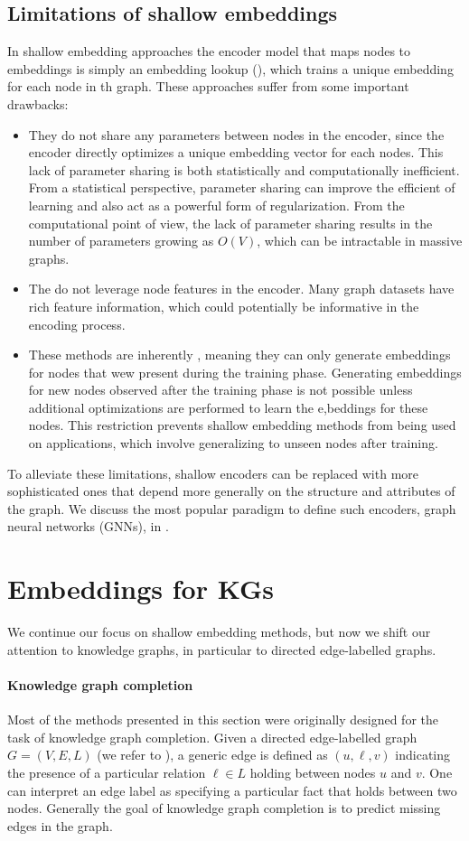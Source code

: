 \subsection{Limitations of shallow embeddings}
In shallow embedding approaches the encoder model that maps nodes to embeddings is simply an embedding lookup (), which trains a unique embedding for each node in th graph. These approaches suffer from some important drawbacks:
\begin{itemize}
    \item They do not share any parameters between nodes in the encoder, since the encoder directly optimizes a unique embedding vector for each nodes. This lack of parameter sharing is both statistically and computationally inefficient. From a statistical perspective, parameter sharing can improve the efficient of learning and also act as a powerful form of regularization. From the computational point of view, the lack of parameter sharing results in the number of parameters growing as $O(V)$, which can be intractable in massive graphs.
    \item The do not leverage node features in the encoder. Many graph datasets have rich feature information, which could potentially be informative in the encoding process.
    \item These methods are inherently , meaning they can only generate embeddings for nodes that wew present during the training phase. Generating embeddings for new nodes observed after the training phase is not possible unless additional optimizations are performed to learn the e,beddings for these nodes. This restriction prevents shallow embedding methods from being used on  applications, which involve generalizing to unseen nodes after training.
\end{itemize}
To alleviate these limitations, shallow encoders can be replaced with more sophisticated ones that depend more generally on the structure and attributes of the graph. We discuss the most popular paradigm to define such encoders, graph neural networks (GNNs), in .

\section{Embeddings for KGs}
We continue our focus on shallow embedding methods, but now we shift our attention to knowledge graphs, in particular to directed edge-labelled graphs.

\paragraph{Knowledge graph completion}
Most of the methods presented in this section were originally designed for the task of knowledge graph completion. Given a directed edge-labelled graph $G=(V, E, L)$ (we refer to ), a generic edge is defined as $(u,\ell,v)$ indicating the presence of a particular relation $\ell \in L$ holding between nodes $u$ and $v$. One can interpret an edge label as specifying a particular fact that holds between two nodes. Generally the goal of knowledge graph completion is to predict missing edges in the graph.

